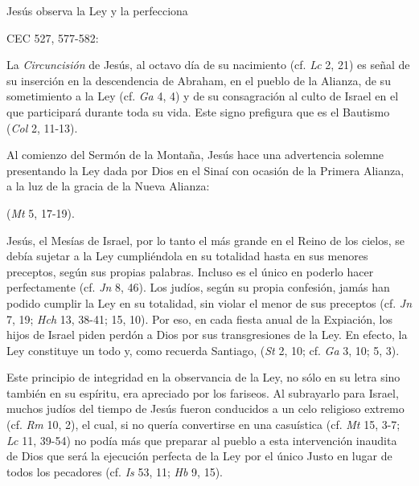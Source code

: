 	Jesús observa la Ley y la perfecciona
	
	CEC 527, 577-582:
	
	 La \emph{Circuncisión} de Jesús, al octavo día de su nacimiento (cf. \emph{Lc} 2, 21) es señal de su inserción en la descendencia de Abraham, en el pueblo de la Alianza, de su sometimiento a la Ley (cf. \emph{Ga} 4, 4) y de su consagración al culto de Israel en el que participará durante toda su vida. Este signo prefigura  que es el Bautismo (\emph{Col} 2, 11-13).
	
	
	 Al comienzo del Sermón de la Montaña, Jesús hace una advertencia solemne presentando la Ley dada por Dios en el Sinaí con ocasión de la Primera Alianza, a la luz de la gracia de la Nueva Alianza:
	
	 (\emph{Mt} 5, 17-19).
	
	 Jesús, el Mesías de Israel, por lo tanto el más grande en el Reino de los cielos, se debía sujetar a la Ley cumpliéndola en su totalidad hasta en sus menores preceptos, según sus propias palabras. Incluso es el único en poderlo hacer perfectamente (cf. \emph{Jn} 8, 46). Los judíos, según su propia confesión, jamás han podido cumplir la Ley en su totalidad, sin violar el menor de sus preceptos (cf. \emph{Jn} 7, 19; \emph{Hch} 13, 38-41; 15, 10). Por eso, en cada fiesta anual de la Expiación, los hijos de Israel piden perdón a Dios por sus transgresiones de la Ley. En efecto, la Ley constituye un todo y, como recuerda Santiago,  (\emph{St} 2, 10; cf. \emph{Ga} 3, 10; 5, 3).
	
	 Este principio de integridad en la observancia de la Ley, no sólo en su letra sino también en su espíritu, era apreciado por los fariseos. Al subrayarlo para Israel, muchos judíos del tiempo de Jesús fueron conducidos a un celo religioso extremo (cf. \emph{Rm} 10, 2), el cual, si no quería convertirse en una casuística  (cf. \emph{Mt} 15, 3-7; \emph{Lc} 11, 39-54) no podía más que preparar al pueblo a esta intervención inaudita de Dios que será la ejecución perfecta de la Ley por el único Justo en lugar de todos los pecadores (cf. \emph{Is} 53, 11; \emph{Hb} 9, 15).
	
